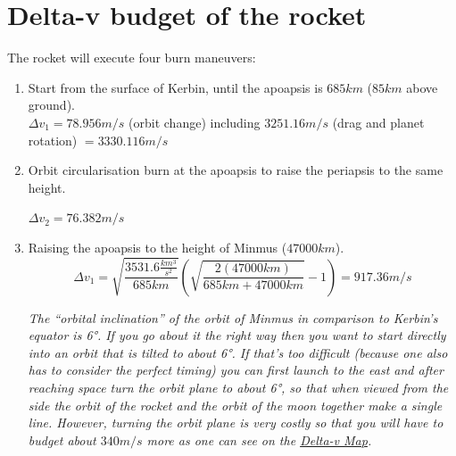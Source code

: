 \documentclass[12pt,paper=A4,numbers=noenddot,bibliography=totoc,listof=totoc,DIV=11,BCOR=1mm]{scrreprt}
\begin{document}
\section{Delta-v budget of the rocket}
\begin{flushleft}
The rocket will execute four burn maneuvers:
\end{flushleft}
\begin{enumerate}
\item Start from the surface of Kerbin, until the apoapsis is $685km$ ($85km$ above ground). \\

$\Delta v_{1} = 78.956 m/s$ (orbit change) including $3251.16 m/s$ (drag and planet rotation) $= 3330.116 m/s$ \\

\item Orbit circularisation burn at the apoapsis to raise the periapsis to the same height.
\begin{flushleft}
$\Delta v_{2} = 76.382 m/s$
\end{flushleft}
\item Raising the apoapsis to the height of Minmus ($47000km$).\\
\begin{equation*}
\Delta v_{1} = \sqrt{\frac{3531.6 \frac{km^{3}}{s^{2}}}{685km}} \left( \sqrt{\frac{2(47000km)}{685km+47000km}}-1 \right) = 917.36 m/s
\end{equation*}

\emph{The ``orbital inclination'' of the orbit of Minmus in comparison to Kerbin's equator is 6°. If you go about it the right way then you want to start directly into an orbit that is tilted to about 6°. If that's too difficult (because one also has to consider the perfect timing) you can first launch to the east and after reaching space turn the orbit plane to about 6°, so that when viewed from the side the orbit of the rocket and the orbit of the moon together make a single line. However, turning the orbit plane is very costly so that you will have to budget about $340m/s$ more as one can see on the \href{https://wiki.kerbalspaceprogram.com/wiki/File:KerbinDeltaVMap.png}{Delta-v Map}.}\\


\end{enumerate}
\end{document}
